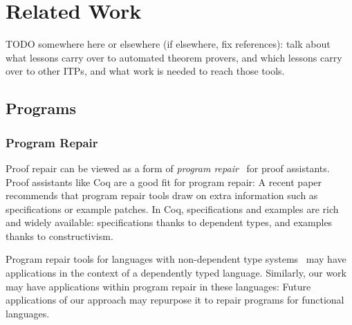\chapter{Related Work}
\label{sec:related}


TODO somewhere here or elsewhere (if elsewhere, fix references): talk about what lessons carry over to automated theorem provers,
and which lessons carry over to other ITPs, and what work is needed to reach those tools.

\section{Programs}

\subsection*{Program Repair} 


Proof repair can be viewed as a form of \textit{program repair}~\cite{Monperrus:2018:ASR:3177787.3105906, Gazzola:2018:ASR:3180155.3182526}
for proof assistants.
Proof assistants like Coq are a good fit for program repair: A recent paper~\cite{Qi:2015:APP:2771783.2771791} 
recommends that program repair tools draw on extra information
such as specifications or example patches. In Coq, specifications and examples 
are rich and widely available: specifications thanks to dependent types,
and examples thanks to constructivism.


Program repair tools for 
languages with non-dependent type 
systems~\cite{Pei:2014:APR:2731750.2731779, Long:2016:APG:2837614.2837617, Le:2017:SSS:3106237.3106309, Mechtaev:2016:ASM:2884781.2884807, Monperrus2015} 
may have applications in the context of a dependently typed language.
Similarly, our work may have applications within program repair in these languages:
Future applications of our approach may repurpose it to repair programs for functional languages.


